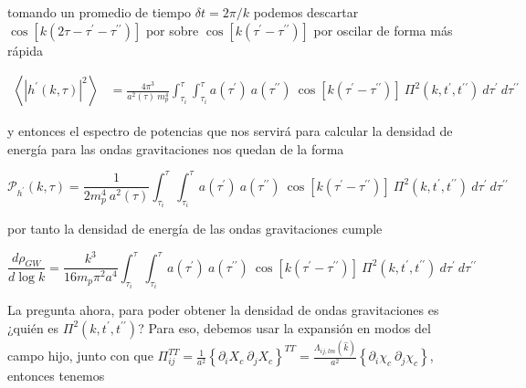 \noindent
tomando un promedio de tiempo $\delta t = 2\pi / k$ podemos descartar $\cos \left[ k \left( 2 \tau - \tau^\prime - \tau^{\prime \prime} \right) \right]$ por sobre $\cos \left[ k \left( \tau^{\prime} - \tau^{\prime \prime} \right) \right]$ por oscilar de forma más rápida

\begin{equation*}
    \begin{split}
        \left\langle \left| h^\prime \left( k, \tau \right) \right|^2 \right\rangle &= \frac{4 \pi^3}{a^2 (\tau) ~ m_p^4} \int_{\tau_i}^{\tau} \int_{\tau_i}^\tau a \left( \tau^\prime \right) ~ a \left( \tau^{\prime \prime} \right) ~ \cos \left[ k \left( \tau^{\prime} - \tau^{\prime \prime} \right) \right] ~ \Pi^2 \left( k, t^\prime, t^{\prime \prime} \right) ~ d\tau^\prime ~ d\tau^{\prime \prime}
    \end{split}
\end{equation*}

\noindent
y entonces el espectro de potencias que nos servirá para calcular la densidad de energía para las ondas gravitaciones nos quedan de la forma


\begin{equation*}
    \mathcal{P}_{h^\prime} (k, \tau) = \frac{1}{2 m_p^4 ~ a^2 (\tau)} \int_{\tau_i}^{\tau} \int_{\tau_i}^\tau a \left( \tau^\prime \right) ~ a \left( \tau^{\prime \prime} \right) ~ \cos \left[ k \left( \tau^{\prime} - \tau^{\prime \prime} \right) \right] ~ \Pi^2 \left( k, t^\prime, t^{\prime \prime} \right) ~ d\tau^\prime ~ d\tau^{\prime \prime}
\end{equation*}

\noindent
por tanto la densidad de energía de las ondas gravitaciones cumple

\begin{equation}
    \frac{d\rho_{GW}}{d \log k} = \frac{k^3}{16 m_p \pi^2 a^4} \int_{\tau_i}^{\tau} \int_{\tau_i}^\tau a \left( \tau^\prime \right) ~ a \left( \tau^{\prime \prime} \right) ~ \cos \left[ k \left( \tau^{\prime} - \tau^{\prime \prime} \right) \right] ~ \Pi^2 \left( k, t^\prime, t^{\prime \prime} \right) ~ d\tau^\prime ~ d\tau^{\prime \prime}
\end{equation}

La pregunta ahora, para poder obtener la densidad de ondas gravitaciones es ¿quién es $\Pi^2 \left( k, t^\prime, t^{\prime \prime} \right)$? Para eso, debemos usar la expansión en modos del campo hijo, junto con que $\displaystyle \Pi_{ij}^{TT} = \frac{1}{a^2} \left\{ \partial_i X_c ~ \partial_j X_c \right\}^{TT} = \frac{\Lambda_{ij,lm} \left( \hat{k} \right)}{a^2} \left\{ \partial_i \chi_c ~ \partial_j \chi_c \right\}$, entonces tenemos


